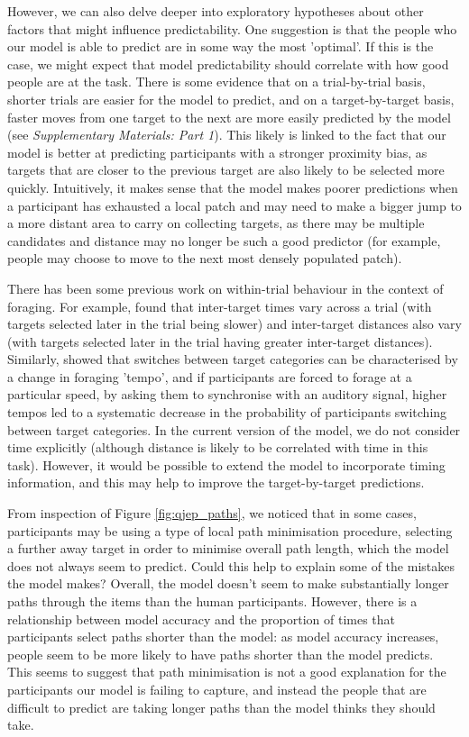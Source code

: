 \documentclass[preprints, article,submit,pdftex,moreauthors]{Definitions/mdpi}
\begin{document}
However, we can also delve deeper into exploratory hypotheses about other factors that might influence predictability. One suggestion is that the people who our model is able to predict are in some way the most 'optimal'. If this is the case, we might expect that model predictability should correlate with how good people are at the task. There is some evidence that on a trial-by-trial basis, shorter trials are easier for the model to predict, and on a target-by-target basis, faster moves from one target to the next are more easily predicted by the model (see \textit{Supplementary Materials: Part 1}). This likely is linked to the fact that our model is better at predicting participants with a stronger proximity bias, as targets that are closer to the previous target are also likely to be selected more quickly. Intuitively, it makes sense that the model makes poorer predictions when a participant has exhausted a local patch and may need to make a bigger jump to a more distant area to carry on collecting targets, as there may be multiple candidates and distance may no longer be such a good predictor (for example, people may choose to move to the next most densely populated patch). 
 
There has been some previous work on within-trial behaviour in the context of foraging. For example, \citep{tagu2020} found that inter-target times vary across a trial (with targets selected later in the trial being slower) and inter-target distances also vary (with targets selected later in the trial having greater inter-target distances). Similarly, \citep{thornton2022foraging} showed that switches between target categories can be characterised by a change in foraging 'tempo', and if participants are forced to forage at a particular speed, by asking them to synchronise with an auditory signal, higher tempos led to a systematic decrease in the probability of participants switching between target categories. In the current version of the model, we do not consider time explicitly (although distance is likely to be correlated with time in this task). However, it would be possible to extend the model to incorporate timing information, and this may help to improve the target-by-target predictions.
 
From inspection of Figure \ref{fig:qjep_paths}, we noticed that in some cases, participants may be using a type of local path minimisation procedure, selecting a further away target in order to minimise overall path length, which the model does not always seem to predict. Could this help to explain some of the mistakes the model makes? Overall, the model doesn't seem to make substantially longer paths through the items than the human participants. However, there is a relationship between model accuracy and the proportion of times that participants select paths shorter than the model: as model accuracy increases, people seem to be more likely to have paths shorter than the model predicts. This seems to suggest that path minimisation is not a good explanation for the participants our model is failing to capture, and instead the people that are difficult to predict are taking longer paths than the model thinks they should take.
\end{document}
